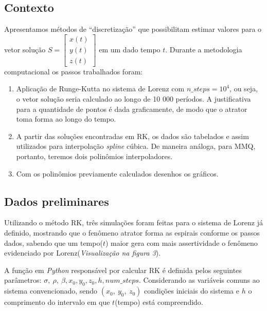 \documentclass[12pt, a4paper]{article}
\begin{document}
    \subsection{Contexto}
    Apresentamos métodos de ``discretização'' que possibilitam estimar valores
    para o vetor solução $S = \begin{bmatrix} x(t) \\ y(t) \\ z(t)\end{bmatrix}$ em
    um dado tempo $t$. Durante a metodologia computacional os passos trabalhados
    foram:
    \begin{enumerate}
        \item Aplicação de Runge-Kutta no sistema de Lorenz com $n\_steps =
                  10^4$, ou seja, o vetor solução seria calculado ao longo de 10
              000 períodos. A
              justificativa para a quantidade de pontos é dada graficamente, de
              modo que o
              atrator toma forma ao longo do tempo.
        \item A partir das soluções encontradas em RK, os dados são tabelados e
              assim utilizados para interpolação \textit{spline} cúbica. De maneira
              análoga,
              para MMQ, portanto, teremos dois polinômios interpoladores.
        \item Com os polinômios previamente calculados desenhos os gráficos.
    \end{enumerate}
    
    \subsection{Dados preliminares}
    Utilizando o método RK, três simulações foram feitas para o sistema de
    Lorenz já definido, mostrando que o fenômeno atrator forma as espirais conforme
    os passos dados, sabendo que um tempo($t$) maior gera com mais assertividade o
    fenômeno evidenciado por Lorenz(\textit{Visualização na figura 3}).
    
    A função em \textit{Python} responsável por calcular RK é definida pelos
    seguintes parâmetros: $\sigma,\ \rho,\ \beta, x_0, y_0, z_0, h, num\_steps$.
    Considerando as variáveis comuns ao sistema convencionado, sendo $(x_0,\ y_0,\
        z_0)$ condições iniciais do sistema e $h$ o comprimento do intervalo em que
    $t$(tempo) está compreendido.
    
\end{document}
